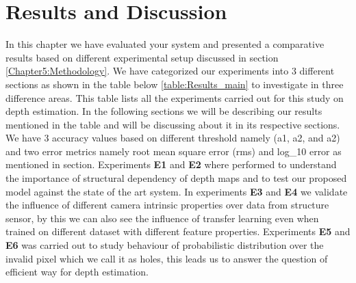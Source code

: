 

\chapter{Results and Discussion}

\label{Chapter6:Results}

 
 
In this chapter we have evaluated your system and presented a comparative results  based on different experimental setup discussed in section \ref{Chapter5:Methodology}. We have categorized our experiments into 3 different sections as shown in the table below \ref{table:Results_main} to investigate in three difference areas. This table lists all the experiments carried out for this study on depth estimation. In the following sections we will be describing our results mentioned in the table and will be discussing about it in its respective sections.  We have 3 accuracy values based on different threshold namely (a1, a2, and a2) and two error metrics namely root mean square error (rms) and log\_10 error as mentioned in section. Experiments \textbf{E1} and \textbf{E2} where performed to understand the importance of structural dependency of depth maps and to test our proposed model against the state of the art system. In experiments \textbf{E3} and \textbf{E4} we validate the influence of different camera intrinsic properties over data from structure sensor, by this we can also see the influence of transfer learning even when trained on different dataset with different feature properties. Experiments \textbf{E5} and \textbf{E6} was carried out to study behaviour of probabilistic distribution over the invalid pixel which we call it as holes, this leads us to answer the question of efficient way for depth estimation.


